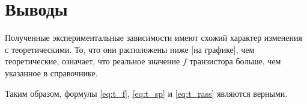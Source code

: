 \section{Выводы}

Полученные экспериментальные зависимости имеют схожий характер изменения с теоретическими. То, что они расположены ниже [на графике], чем теоретические, означает, что реальное значение $f$ транзистора больше, чем указанное в справочнике. 

Таким образом, формулы \ref{eq:t_f}, \ref{eq:t_sp} и \ref{eq:t_rass} являются верными.

